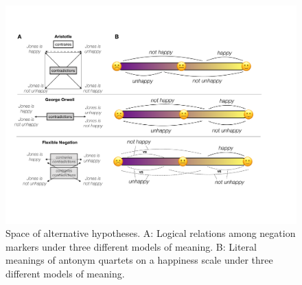 \documentclass[floatsintext,doc]{apa6}
\let\rmarkdownfootnote\footnote%
\def\footnote{\protect\rmarkdownfootnote}
\begin{document}

\begin{figure}[t]
\centering\includegraphics{figs/happy-scale5}
\caption{Space of alternative hypotheses. A: Logical relations among negation markers under three different models of meaning. B: Literal meanings of antonym quartets on a happiness scale under three different models of meaning.  \label{fig:happy-scale}}
\end{figure}
\end{document}
